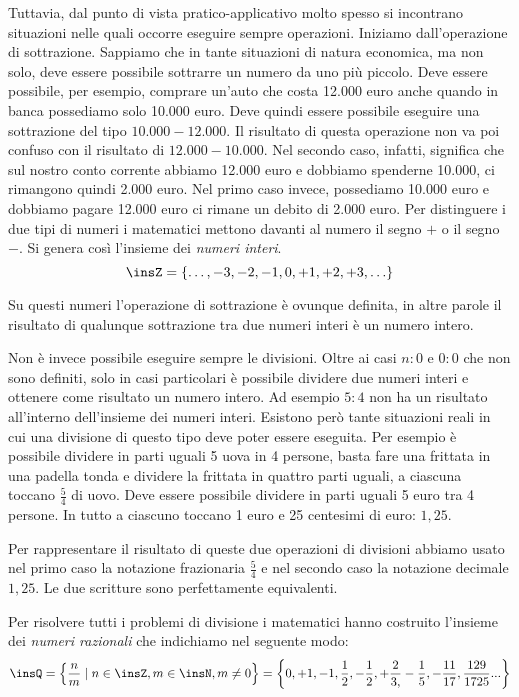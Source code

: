 Tuttavia, dal punto di vista pratico-applicativo molto spesso si incontrano 
situazioni nelle quali occorre eseguire sempre operazioni. Iniziamo 
dall'operazione di sottrazione. Sappiamo che in tante situazioni di natura 
economica, ma non solo, deve essere possibile sottrarre un numero da uno più 
piccolo. Deve essere possibile, per esempio, comprare un'auto che costa 12.000 
euro anche quando in banca possediamo solo 10.000 euro. Deve quindi essere 
possibile eseguire una sottrazione del tipo $10.000-12.000$. Il risultato di 
questa operazione non va poi confuso con il risultato di $12.000-10.000$. Nel 
secondo caso, infatti, significa che sul nostro conto corrente abbiamo 12.000 
euro e dobbiamo spenderne 10.000, ci rimangono quindi 2.000 euro. Nel primo 
caso 
invece, possediamo 10.000 euro e dobbiamo pagare
12.000 euro ci rimane un debito di 2.000 euro. Per distinguere i due tipi di 
numeri i matematici mettono davanti al numero il segno $+$ o il segno $-$. Si 
genera così l'insieme dei \emph{numeri interi}.
\[\insZ=\{\ldots,-3,-2,-1,0,+1,+2,+3,\ldots\}\]

Su questi numeri l'operazione di sottrazione è ovunque definita, in altre 
parole 
il risultato di qualunque sottrazione tra due numeri interi è un numero intero.

Non è invece possibile eseguire sempre le divisioni. Oltre ai casi $n:0$ e 
$0:0$ che non sono definiti, solo in casi particolari è possibile dividere 
due numeri interi e ottenere come risultato un numero intero. Ad esempio $5:4$ 
non ha un risultato all'interno dell'insieme dei numeri interi. 
Esistono però tante situazioni reali in cui una divisione di questo tipo deve 
poter essere eseguita. Per esempio è possibile dividere in parti uguali 5 uova 
in 4 persone, basta fare una frittata in una padella tonda e dividere la 
frittata in quattro parti uguali, a ciascuna toccano $\frac{5}{4}$ di uovo. Deve
essere possibile dividere in parti uguali 5 euro tra 4 persone. 
In tutto a ciascuno toccano 1 euro e 25 centesimi di euro: $1,25$.

Per rappresentare il risultato di queste due operazioni di divisioni abbiamo 
usato nel primo caso la notazione frazionaria $\frac{5}{4}$ e nel secondo caso 
la notazione decimale $1,25$. Le due scritture sono perfettamente equivalenti.

Per risolvere tutti i problemi di divisione i matematici hanno costruito 
l'insieme dei \emph{numeri razionali} che indichiamo nel seguente modo:
\[
\insQ=\left\{\frac{n}{m} \mid n\in \insZ,m\in \insN,m\neq
0\right\}=\left\{0,+1,-1,\frac{1}{2},-\frac{1}{2},+\frac{2}{3,}-\frac{1}{5},
-\frac{11}{17},\frac{129}{1725}...\right\}
\]

